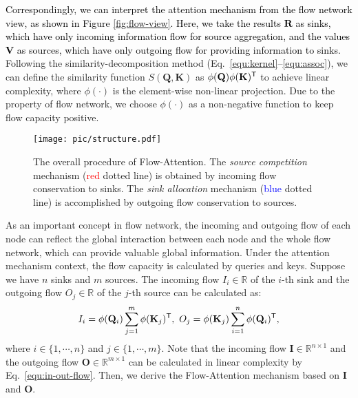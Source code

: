 \documentclass[nohyperref]{article}
\theoremstyle{plain}
\theoremstyle{definition}
\theoremstyle{remark}
\newcommand{\update}[1]{{\textcolor{black}{#1}}}
\begin{document}
\update{Correspondingly, we can interpret the attention mechanism from the flow network view, as shown in Figure \ref{fig:flow-view}. Here, we take the results $\mathbf{R}$ as sinks, which have only incoming information flow for source aggregation, and the values $\mathbf{V}$ as sources, which have only outgoing flow for providing information to sinks.} Following the similarity-decomposition method (Eq.~\eqref{equ:kernel}--\eqref{equ:assoc}), we can define the similarity function $S(\mathbf{Q}, \mathbf{K})$ as $\phi(\mathbf{Q})\phi(\mathbf{K})^{\sf T}$ to achieve linear complexity, where $\phi(\cdot)$ is the element-wise non-linear projection. Due to the property of flow network, we choose $\phi(\cdot)$ as a non-negative function to keep flow capacity positive.

\begin{figure*}[t]
\begin{center}
	\centerline{\texttt{[image: pic/structure.pdf]}}
	\caption{The overall procedure of Flow-Attention. The \emph{source competition} mechanism (\textcolor{red}{red} dotted line) is obtained by incoming flow conservation to sinks. The \emph{sink allocation} mechanism (\textcolor{blue}{blue} dotted line) is accomplished by outgoing flow conservation to sources. }
	\label{fig:overall}
\end{center}
\vspace{-5pt}
\end{figure*}

As an important concept in flow network, the incoming and outgoing flow of each node can reflect the global interaction between each node and the whole flow network, which can provide valuable global information. Under the attention mechanism context, the flow capacity is calculated by queries and keys. Suppose we have $n$ sinks and $m$ sources. The incoming flow ${I}_{i}\in\mathbb{R}$ of the $i$-th sink and the outgoing flow ${O}_{j}\in\mathbb{R}$ of the $j$-th source can be calculated as:
\begin{equation}
	\begin{split}\label{equ:in-out-flow}
	    {I}_{i} = \phi(\mathbf{Q}_{i})\sum_{j=1}^{m}\phi(\mathbf{K}_{j})^{\sf T},\ {O}_{j} =\phi(\mathbf{K}_{j})\sum_{i=1}^{n}\phi(\mathbf{Q}_{i})^{\sf T},
	\end{split}
\end{equation}
where $i\in\{1,\cdots,n\}$ and $j\in\{1,\cdots,m\}$. Note that the incoming flow $\mathbf{I}\in\mathbb{R}^{n\times1}$ and the outgoing flow $\mathbf{O}\in\mathbb{R}^{m\times1}$ can be calculated in linear complexity by Eq.~\eqref{equ:in-out-flow}. Then, we derive the Flow-Attention mechanism based on $\mathbf{I}$ and $\mathbf{O}$.
\end{document}
